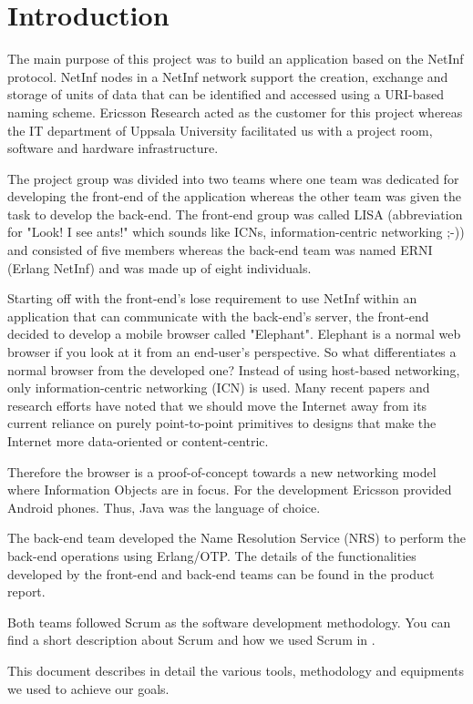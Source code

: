 \section{Introduction}
The main purpose of this project was to build an application based on the NetInf protocol. NetInf nodes in a NetInf network support the creation, exchange and storage of units of data that can be identified and accessed using a URI-based naming scheme. \cite{netinfspecs} Ericsson Research acted as the customer for this project whereas the IT department of Uppsala University facilitated us with a project room, software and hardware infrastructure. 

The project group was divided into two teams where one team was dedicated for developing the front-end of the 
application whereas the other team was given the task to develop the back-end. The front-end group was called 
LISA (abbreviation for "Look! I see ants!" which sounds like ICNs, information-centric networking ;-)) and consisted of five members whereas 
the back-end team was named ERNI (Erlang NetInf) and was made up of eight individuals. 

Starting off with the front-end's lose requirement to use NetInf within an application that can communicate with
the back-end's server, the front-end decided to develop a mobile browser called "Elephant". Elephant is a normal
web browser if you look at it from an end-user's perspective. So what differentiates a normal browser
from the developed one? Instead of using host-based networking, only information-centric networking (ICN) is used. Many recent papers and research efforts have noted that we should move the Internet away from its current reliance on purely point-to-point primitives to designs that make the Internet more data-oriented or content-centric. \cite{ghodsietal}  

Therefore the browser is a proof-of-concept towards a new networking model where Information Objects are in focus.
For the development Ericsson provided Android phones. Thus, Java was the language of choice.

The back-end team developed the Name Resolution Service (NRS) to perform the back-end operations using Erlang/OTP. The details of the functionalities developed 
by the front-end and back-end teams can be found in the product report. 

Both teams followed Scrum as the software development methodology. You can find a short description about Scrum and
how we used Scrum in .

This document describes in detail the various tools, methodology and equipments we used to achieve our goals. 

